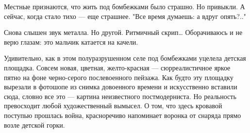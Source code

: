 Местные признаются, что жить под бомбежками было страшно. Но привыкли. А
сейчас, когда стало тихо — еще страшнее. "Все время думаешь: а вдруг опять?.."

Снова слышен звук металла. Но другой. Ритмичный скрип… Оборачиваюсь и не верю
глазам: это мальчик катается на качели. 

Удивительно, как в этом полуразрушенном селе под бомбежками уцелела детская
площадка. Совсем новая, цветная, желто-красная — сюрреалистичное яркое пятно на
фоне черно-серого послевоенного пейзажа. Как будто эту площадку вырезали в
фотошопе из снимка довоенного времени и искусственно вставили сюда, словно все
это — картина неизвестного постмодерниста. Но реальность превосходит любой
художественный вымысел. О том, что здесь кровавой поступью прошлась война,
красноречиво напоминает воронка от снаряда прямо возле детской горки. 

